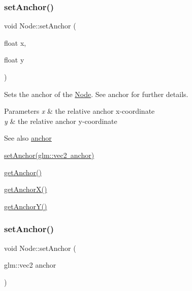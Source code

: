 \subsubsection{\texorpdfstring{setAnchor()}{setAnchor()}\hspace{0.1cm}{\footnotesize\ttfamily [1/2]}}
{\footnotesize\ttfamily void Node\+::set\+Anchor (\begin{DoxyParamCaption}\item[{float}]{x,  }\item[{float}]{y }\end{DoxyParamCaption})}



Sets the anchor of the \mbox{\hyperlink{classsage_1_1Node}{Node}}. See anchor for further details. 


\begin{DoxyParams}{Parameters}
{\em x} & the relative anchor x-\/coordinate \\
\hline
{\em y} & the relative anchor y-\/coordinate \\
\hline
\end{DoxyParams}
\begin{DoxySeeAlso}{See also}
\mbox{\hyperlink{classsage_1_1Node_a0956f07efec6dcbd3cf796a9028b9175}{anchor}} 

\mbox{\hyperlink{classsage_1_1Node_a957a7e578660950b8518926239397ea0}{set\+Anchor(glm\+::vec2 anchor)}} 

\mbox{\hyperlink{classsage_1_1Node_a6733949b7b281d78a8bef8beafe1b630}{get\+Anchor()}} 

\mbox{\hyperlink{classsage_1_1Node_aa5f31c33d60b32b618d3beaf4e5c6c51}{get\+Anchor\+X()}} 

\mbox{\hyperlink{classsage_1_1Node_a78c5f86d0081854603178fb52d8c0a9b}{get\+Anchor\+Y()}} 
\end{DoxySeeAlso}
\mbox{\label{classsage_1_1Node_a957a7e578660950b8518926239397ea0}} 
\subsubsection{\texorpdfstring{setAnchor()}{setAnchor()}\hspace{0.1cm}{\footnotesize\ttfamily [2/2]}}
{\footnotesize\ttfamily void Node\+::set\+Anchor (\begin{DoxyParamCaption}\item[{glm\+::vec2}]{anchor }\end{DoxyParamCaption})}



